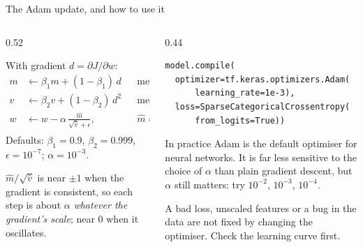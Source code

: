 \documentclass[aspectratio=169,10pt]{beamer}
\begin{document}
\begin{frame}[fragile]{The Adam update, and how to use it}
  \begin{columns}[T,onlytextwidth]
    \begin{column}{0.52\textwidth}
      \begin{defnbox}
        \small
        With gradient $d=\partial J/\partial w$:
        \begin{align*}
          m &\leftarrow \beta_1 m+(1-\beta_1)\,d && \text{mean of } d\\
          v &\leftarrow \beta_2 v+(1-\beta_2)\,d^2 && \text{mean of } d^2\\
          w &\leftarrow w-\alpha\,\frac{\hat m}{\sqrt{\hat v}+\epsilon},
          && \hat m=\tfrac{m}{1-\beta_1^t},\ \hat v=\tfrac{v}{1-\beta_2^t}
        \end{align*}
        Defaults: $\beta_1=0.9$, $\beta_2=0.999$, $\epsilon=10^{-7}$; $\alpha=10^{-3}$.
      \end{defnbox}
      \footnotesize
      $\hat m/\sqrt{\hat v}$ is near $\pm1$ when the gradient is consistent, so each step is
      about $\alpha$ \emph{whatever the gradient's scale}; near $0$ when it oscillates.
    \end{column}
    \begin{column}{0.44\textwidth}
      \footnotesize
\begin{lstlisting}
model.compile(
  optimizer=tf.keras.optimizers.Adam(
      learning_rate=1e-3),
  loss=SparseCategoricalCrossentropy(
      from_logits=True))
\end{lstlisting}
      \vspace{1mm}
      \begin{block}{In practice}
        Adam is the default optimiser for neural networks. It is far less sensitive to the
        choice of $\alpha$ than plain gradient descent, but $\alpha$ still matters: try
        $10^{-2}$, $10^{-3}$, $10^{-4}$.
      \end{block}
      \begin{pitfall}
        \footnotesize A bad loss, unscaled features or a bug in the data are not fixed by
        changing the optimiser. Check the learning curve first.
      \end{pitfall}
    \end{column}
  \end{columns}
\end{frame}

\end{document}

